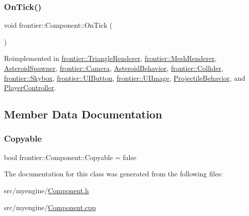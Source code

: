 \subsubsection{\texorpdfstring{On\+Tick()}{OnTick()}}
{\footnotesize\ttfamily void frontier\+::\+Component\+::\+On\+Tick (\begin{DoxyParamCaption}{ }\end{DoxyParamCaption})\hspace{0.3cm}{\ttfamily [virtual]}}



Reimplemented in \hyperlink{classfrontier_1_1_triangle_renderer_a1db716057c1fcc2c10500958a732963b}{frontier\+::\+Triangle\+Renderer}, \hyperlink{classfrontier_1_1_mesh_renderer_acffde7174ddb009751e360df5d346922}{frontier\+::\+Mesh\+Renderer}, \hyperlink{class_asteroid_spawner_acd2744a9a1ac8f13ac28220b33b9f750}{Asteroid\+Spawner}, \hyperlink{classfrontier_1_1_camera_a1f318703a68e4c070c85a1d9a27446d0}{frontier\+::\+Camera}, \hyperlink{class_asteroid_behavior_a3c1287599e132b49be851d9eeec6380e}{Asteroid\+Behavior}, \hyperlink{classfrontier_1_1_collider_ac03782c94e8f7a2064ea1441cbd12c81}{frontier\+::\+Collider}, \hyperlink{classfrontier_1_1_skybox_a38b2ec1a28314c901f4388745d8f0471}{frontier\+::\+Skybox}, \hyperlink{classfrontier_1_1_u_i_button_a8eda4323e4d0c2cd2c6a4639f39a1a09}{frontier\+::\+U\+I\+Button}, \hyperlink{classfrontier_1_1_u_i_image_a4e0d055c0add55fa5e63ae892ea59498}{frontier\+::\+U\+I\+Image}, \hyperlink{class_projectile_behavior_a7756651ba998e7f3c0abcafcf25796ae}{Projectile\+Behavior}, and \hyperlink{class_player_controller_a5641058df338563ff6bb6bce7645ef7b}{Player\+Controller}.



\subsection{Member Data Documentation}
\mbox{\label{classfrontier_1_1_component_a02ebe1c95395e16efa33ddc8499c259c}} 
\subsubsection{\texorpdfstring{Copyable}{Copyable}}
{\footnotesize\ttfamily bool frontier\+::\+Component\+::\+Copyable = false\hspace{0.3cm}{\ttfamily [protected]}}



The documentation for this class was generated from the following files\+:\begin{DoxyCompactItemize}
\item 
src/myengine/\hyperlink{_component_8h}{Component.\+h}\item 
src/myengine/\hyperlink{_component_8cpp}{Component.\+cpp}\end{DoxyCompactItemize}
